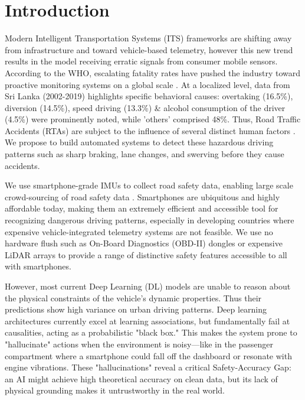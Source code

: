 \documentclass[pdflatex,sn-mathphys-num]{sn-jnl}
\theoremstyle{thmstyleone}
\theoremstyle{thmstyletwo}
\theoremstyle{thmstylethree}
\begin{document}

\maketitle

\FloatBarrier
\section{Introduction}\label{sec:introduction}

Modern Intelligent Transportation Systems (ITS) frameworks are shifting away from infrastructure and toward vehicle-based telemetry, however this new trend results in the model receiving erratic signals from consumer mobile sensors. According to the WHO, escalating fatality rates have pushed the industry toward proactive monitoring systems on a global scale \cite{who2023}. At a localized level, data from Sri Lanka (2002-2019) highlights specific behavioral causes: overtaking (16.5\%), diversion (14.5\%), speed driving (13.3\%) \& alcohol consumption of the driver (4.5\%) were prominently noted, while 'others' comprised 48\%. Thus, Road Traffic Accidents (RTAs) are subject to the influence of several distinct human factors \cite{epid2024}. We propose to build automated systems to detect these hazardous driving patterns such as sharp braking, lane changes, and swerving before they cause accidents.

We use smartphone-grade IMUs to collect road safety data, enabling large scale crowd-sourcing of road safety data \cite{handel2014}. Smartphones are ubiquitous and highly affordable today, making them an extremely efficient and accessible tool for recognizing dangerous driving patterns, especially in developing countries where expensive vehicle-integrated telemetry systems are not feasible. We use no hardware flush such as On-Board Diagnostics (OBD-II) dongles or expensive LiDAR arrays to provide a range of distinctive safety features accessible to all with smartphones.

However, most current Deep Learning (DL) models are unable to reason about the physical constraints of the vehicle's dynamic properties. Thus their predictions show high variance on urban driving patterns. Deep learning architectures currently excel at learning associations, but fundamentally fail at causalities, acting as a probabilistic "black box." This makes the system prone to "hallucinate" actions when the environment is noisy—like in the passenger compartment where a smartphone could fall off the dashboard or resonate with engine vibrations. These "hallucinations" reveal a critical Safety-Accuracy Gap: an AI might achieve high theoretical accuracy on clean data, but its lack of physical grounding makes it untrustworthy in the real world.
\end{document}
